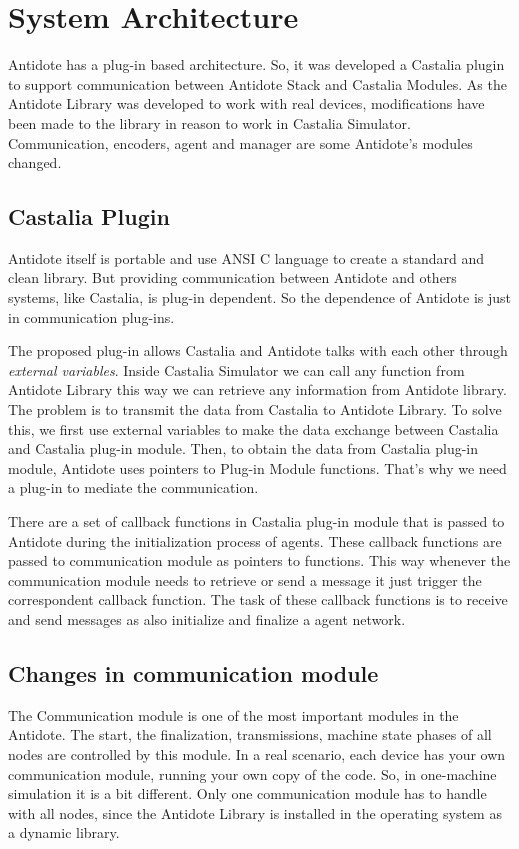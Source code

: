\section{System Architecture}

Antidote has a plug-in based architecture. So, it was developed a Castalia plugin to support communication between Antidote Stack and Castalia Modules. As the Antidote Library was developed to work with real devices, modifications have been made to the library in reason to work in Castalia Simulator. Communication, encoders, agent and manager are some Antidote's modules changed.

\subsection{Castalia Plugin}

Antidote itself is portable and use ANSI C language to create a standard and clean library. But providing communication between Antidote and others systems, like Castalia, is plug-in dependent. So the dependence of Antidote is just in communication plug-ins.

The proposed plug-in allows Castalia and Antidote talks with each other through \textit{external variables}. Inside Castalia Simulator we can call any function from Antidote Library this way we can retrieve any information from Antidote library. The problem is to transmit the data from Castalia to Antidote Library. To solve this, we first use external variables to make the data exchange between Castalia and Castalia plug-in module. Then, to obtain the data from Castalia plug-in module, Antidote uses pointers to Plug-in Module functions. That's why we need a plug-in to mediate the communication. 

There are a set of callback functions in Castalia plug-in module that is passed to Antidote during the initialization process of agents. These callback functions are passed to communication module as pointers to functions.
This way whenever the communication module needs to retrieve or send a message it just trigger the correspondent callback function. The task of these callback functions is to receive and send messages as also initialize and finalize a agent network.

\subsection{Changes in communication module}

The Communication module is one of the most important modules in the Antidote. The start, the finalization, transmissions, machine state phases of all nodes are controlled by this module. In a real scenario, each device has your own communication module, running your own copy of the code. So, in one-machine simulation it is a bit different. Only one communication module has to handle with all nodes, since the Antidote Library is installed in the operating system as a dynamic library.

